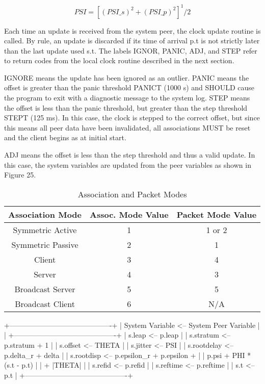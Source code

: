 $$
PSI = [(PSI\_s)^2 + (PSI\_p)^2]^1/2
$$

Each time an update is received from the system peer, the clock
update routine is called.  By rule, an update is discarded if its
time of arrival p.t is not strictly later than the last update used
s.t.  The labels IGNOR, PANIC, ADJ, and STEP refer to return codes
from the local clock routine described in the next section.

IGNORE means the update has been ignored as an outlier.  PANIC means
the offset is greater than the panic threshold PANICT (1000 s) and
SHOULD cause the program to exit with a diagnostic message to the
system log.  STEP means the offset is less than the panic threshold,
but greater than the step threshold STEPT (125 ms).  In this case,
the clock is stepped to the correct offset, but since this means all
peer data have been invalidated, all associations MUST be reset and
the client begins as at initial start.

ADJ means the offset is less than the step threshold and thus a valid
update.  In this case, the system variables are updated from the peer
variables as shown in Figure 25.

\begin{table}[htb]
\center
\begin{tabular}{c | c | c}
Association Mode & Assoc. Mode Value & Packet Mode Value \\
\hline
\hline
Symmetric Active & 1 & 1 or 2 \\
Symmetric Passive & 2 & 1 \\
Client & 3 & 4 \\
Server & 4 & 3 \\
Broadcast Server & 5 & 5 \\
Broadcast Client & 6 & N/A \\
\hline
\end{tabular}
\label{association_and_packet_modes}
\caption{Association and Packet Modes}
\end{table}

              +-------------------------------------------+
              | System Variable <-- System Peer Variable  |        |
              +-------------------------------------------+
              | s.leap      <-- p.leap                    |
              | s.stratum   <-- p.stratum + 1             |
              | s.offset    <-- THETA                     |
              | s.jitter    <-- PSI                       |
              | s.rootdelay <-- p.delta\_r + delta         |
              | s.rootdisp  <-- p.epsilon\_r + p.epsilon + |
              |                 p.psi + PHI * (s.t - p.t) |
              |                 + |THETA|                 |
              | s.refid     <-- p.refid                   |
              | s.reftime   <-- p.reftime                 |
              | s.t         <-- p.t                       |
              +-------------------------------------------+

